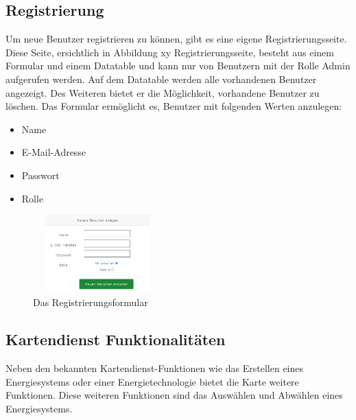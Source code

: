 \subsection{Registrierung}
Um neue Benutzer registrieren zu können, gibt es eine eigene Registrierungsseite. Diese Seite, ersichtlich in Abbildung xy Registrierungsseite, besteht aus einem Formular und einem Datatable und kann nur von Benutzern mit der Rolle Admin aufgerufen werden. Auf dem Datatable werden alle vorhandenen Benutzer angezeigt. Des Weiteren bietet er die Möglichkeit, vorhandene Benutzer zu löschen. Das Formular ermöglicht es, Benutzer mit folgenden Werten anzulegen:
\begin{itemize}
	\item Name  
	\item E-Mail-Adresse
	\item Passwort  
	\item Rolle 
\end{itemize}
\begin{figure}[h]
	\centering
	\includegraphics[height=3cm,width=5cm]{images/RegisterFormular}
	\caption{Das Registrierungsformular}
	\label{fig:Register Formular}
\end{figure}



\subsection{Kartendienst Funktionalitäten}
Neben den bekannten Kartendienst-Funktionen wie das Erstellen eines Energiesystems oder einer Energietechnologie bietet die Karte weitere Funktionen. Diese weiteren Funktionen sind das Auswählen und Abwählen eines Energiesystems.

